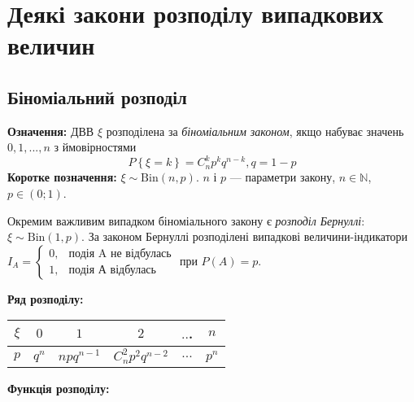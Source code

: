 \section{Деякі закони розподілу випадкових величин}

\subsection{Біноміальний розподіл}
\noindent\textbf{Означення:}
    ДВВ $\xi$ розподілена за \emph{біноміальним законом}, 
    якщо набуває значень $0,1,...,n$ з ймовірностями \begin{equation}
        P\left\{\xi = k\right\} = C_n^k p^k q^{n-k}, q = 1 - p
    \end{equation}
\textbf{Коротке позначення:} $\xi \sim \mathrm{Bin}(n, p)$.
    $n$ і $p$ --- параметри закону, $n\in \mathbb{N}$, $p\in (0;1)$.

Окремим важливим випадком біноміального закону є \emph{розподіл Бернуллі}: $\xi \sim \mathrm{Bin}(1, p)$.
За законом Бернуллі розподілені випадкові величини-індикатори $I_A = \begin{cases}
    0, & \text{подія A не відбулась}\\ 1, & \text{подія А відбулась}
\end{cases}$ при $P(A) = p$.

\noindent\textbf{Ряд розподілу:}

\begin{tabular}{|c|c|c|c|c|c|}
    \hline
    $\xi$ & $0$ & $1$ & $2$ & $..$. & $n$ \\
    \hline
    $p$ & $q^n$ & $npq^{n-1}$ & $C_n^2 p^2 q^{n-2}$ & $...$ & $p^n$ \\
    \hline
\end{tabular}

\noindent\textbf{Функція розподілу:}

